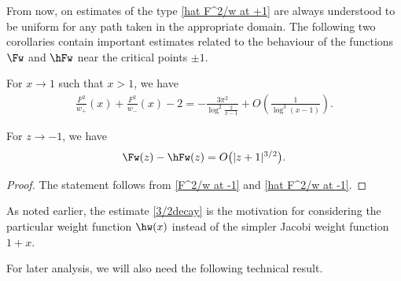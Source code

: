 From now, on estimates of the type \eqref{hat F^2/w at +1} are always understood to be uniform for any path taken in the appropriate domain. The following two corollaries contain important estimates related to the behaviour of the functions $\Fw$ and $\hFw$ near the critical points $\pm 1$.
\begin{Corollary}[{\cite[Proposition~2.4]{CD}}]\label{CorF+1} For $x \to 1$ such that $x > 1$, we have
\begin{align}\label{Diff F^2/w at +1}
\frac{F^2}{w_+}(x)+\frac{F^2}{w_-}(x) - 2 = - \frac{3\pi^2}{\log^2 \frac{2}{x-1}} + O\left(\frac{1}{\log^3(x-1)}\right).
\end{align}
\end{Corollary}

\begin{Corollary}\label{CorF-1}
 For $z \to -1$, we have
\begin{align}\label{3/2decay}
 \Fw(z)-\hFw(z) = O\big(|z+1|^{3/2}\big).
\end{align}
\end{Corollary}
\begin{proof}
The statement follows from \eqref{F^2/w at -1} and \eqref{hat F^2/w at -1}.
\end{proof}

\begin{Remark}
As noted earlier, the estimate \eqref{3/2decay} is the motivation for considering the particular weight function $\hw(x)$ instead of the simpler Jacobi weight function $1+x$.
\end{Remark}

For later analysis, we will also need the following technical result.

